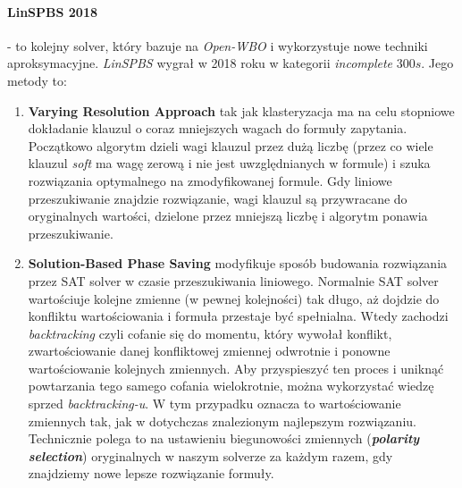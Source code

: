 \documentclass[shortabstract]{iithesis}
\begin{document}
\paragraph{LinSPBS 2018 \cite{openwbo}} - to kolejny solver, który bazuje na \textit{Open-WBO} i wykorzystuje nowe techniki aproksymacyjne. \textit{LinSPBS} wygrał w 2018 roku w kategorii \textit{incomplete} $300s$. Jego metody to:
\begin{enumerate}
	\item \textbf{Varying Resolution Approach} tak jak klasteryzacja ma na celu stopniowe dokładanie klauzul o coraz mniejszych wagach do formuły zapytania. Początkowo algorytm dzieli wagi klauzul przez dużą liczbę (przez co wiele klauzul \textit{soft} ma wagę zerową i nie jest uwzględnianych w formule) i szuka rozwiązania optymalnego na zmodyfikowanej formule. Gdy liniowe przeszukiwanie znajdzie rozwiązanie, wagi klauzul są przywracane do oryginalnych wartości, dzielone przez mniejszą liczbę i algorytm ponawia przeszukiwanie. 

	\item \textbf{Solution-Based Phase Saving} modyfikuje sposób budowania rozwiązania przez SAT solver w czasie przeszukiwania liniowego. Normalnie SAT solver wartościuje kolejne zmienne (w pewnej kolejności) tak długo, aż dojdzie do konfliktu wartościowania i formuła przestaje być spełnialna. Wtedy zachodzi \textit{backtracking} czyli cofanie się do momentu, który wywołał konflikt, zwartościowanie danej konfliktowej zmiennej odwrotnie i ponowne wartościowanie kolejnych zmiennych. Aby przyspieszyć ten proces i uniknąć powtarzania tego samego cofania wielokrotnie, można wykorzystać wiedzę sprzed \textit{backtracking-u}. 
	W tym przypadku oznacza to wartościowanie zmiennych tak, jak w dotychczas znalezionym najlepszym rozwiązaniu. Technicznie polega to na ustawieniu biegunowości zmiennych (\textbf{\textit{polarity selection}}) oryginalnych w naszym solverze za każdym razem, gdy znajdziemy nowe lepsze rozwiązanie formuły.
\end{enumerate}
 
\end{document}
